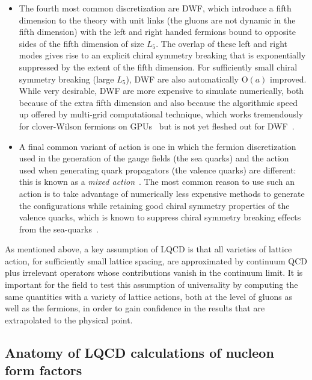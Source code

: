 \documentclass{ar-1col}
\begin{document}
\begin{itemize}[leftmargin=*]
\item The fourth most common discretization are DWF, which introduce a fifth dimension to the theory with unit links (the gluons are not dynamic in the fifth dimension) with the left and right handed fermions bound to opposite sides of the fifth dimension of size $L_5$.  The overlap of these left and right modes gives rise to an explicit chiral symmetry breaking that is exponentially suppressed by the extent of the fifth dimension.  For sufficiently small chiral symmetry breaking (large $L_5$), DWF are also automatically $\mathrm{O}(a)$ improved.
While very desirable, DWF are more expensive to simulate numerically, both because of the extra fifth dimension and also because the algorithmic speed up offered by multi-grid computational technique, which works tremendously for clover-Wilson fermions on GPUs~\cite{Clark:2016rdz} but is not yet fleshed out for DWF~\cite{Boyle:2014rwa,Cohen:2011ivh,Yamaguchi:2016kop,Brower:2020xmc,Boyle:2021wcf}.

\item A final common variant of action is one in which the fermion discretization used in the generation of the gauge fields (the sea quarks) and the action used when generating quark propagators (the valence quarks) are different: this is known as a \textit{mixed action}~\cite{Renner:2004ck}.
The most common reason to use such an action is to take advantage of numerically less expensive methods to generate the configurations while retaining good chiral symmetry properties of the valence quarks, which is known to suppress chiral symmetry breaking effects from the sea-quarks~\cite{Bar:2002nr,Bar:2005tu,Tiburzi:2005is,Chen:2007ug}.

\end{itemize}
As mentioned above, a key assumption of LQCD is that all varieties of lattice action, for sufficiently small lattice spacing, are approximated by continuum QCD plus irrelevant operators whose contributions vanish in the continuum limit.
It is important for the field to test this assumption of universality by computing the same quantities with a variety of lattice actions, both at the level of gluons as well as the fermions, in order to gain confidence in the results that are extrapolated to the physical point.


\subsection{Anatomy of LQCD calculations of nucleon form factors\label{sec:calc_anatomy}}
\end{document}
